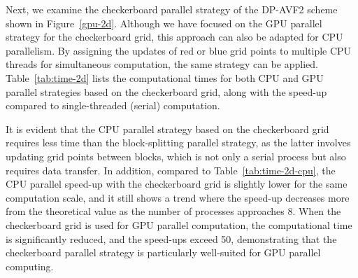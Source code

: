 \documentclass[fleqn,11pt]{elsarticle}
\numberwithin{equation}{section}
\begin{document}
\begin{table}[H]
	\caption{CPU times and speed-ups of the DP-AVF2 schemes with varying numbers of threads and spatial discretizations for the 2D KGS equations. The block-splitting parallel strategy in Figure \ref{cpu-2d} is applied.}\label{tab:time-2d-cpu}
	\centering
\end{table}


Next, we examine the checkerboard parallel strategy of the DP-AVF2 scheme shown in Figure~\ref{gpu-2d}. Although we have focused on the GPU parallel strategy for the checkerboard grid, this approach can also be adapted for CPU parallelism. By assigning the updates of red or blue grid points to multiple CPU threads for simultaneous computation, the same strategy can be applied. Table~\ref{tab:time-2d} lists the computational times for both CPU and GPU parallel strategies based on the checkerboard grid, along with the speed-up compared to single-threaded (serial) computation. 

It is evident that the CPU parallel strategy based on the checkerboard grid requires less time than the block-splitting parallel strategy, as the latter involves updating grid points between blocks, which is not only a serial process but also requires data transfer. In addition, compared to Table~\ref{tab:time-2d-cpu}, the CPU parallel speed-up with the checkerboard grid is slightly lower for the same computation scale, and it still shows a trend where the speed-up decreases more from the theoretical value as the number of processes approaches 8. When the checkerboard grid is used for GPU parallel computation, the computational time is significantly reduced, and the speed-ups exceed 50, demonstrating that the checkerboard parallel strategy is particularly well-suited for GPU parallel computing.
\end{document}
